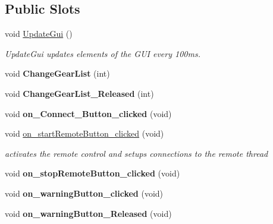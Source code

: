 \subsection*{Public Slots}
\begin{DoxyCompactItemize}
\item 
void \hyperlink{class_main_window_a042e863e901d40459d15a354ee4f9283}{Update\+Gui} ()
\begin{DoxyCompactList}\small\item\em Update\+Gui updates elements of the G\+U\+I every 100ms. \end{DoxyCompactList}\item 
\hypertarget{class_main_window_a3a9f39d07cb3fe42a152c05757c1da5a}{}void {\bfseries Change\+Gear\+List} (int)\label{class_main_window_a3a9f39d07cb3fe42a152c05757c1da5a}

\item 
\hypertarget{class_main_window_acd5aa2271fa4b95c8e315ea08e1ded23}{}void {\bfseries Change\+Gear\+List\+\_\+\+Released} (int)\label{class_main_window_acd5aa2271fa4b95c8e315ea08e1ded23}

\item 
\hypertarget{class_main_window_a5d07507433b877fab2041feb43a118aa}{}void {\bfseries on\+\_\+\+Connect\+\_\+\+Button\+\_\+clicked} (void)\label{class_main_window_a5d07507433b877fab2041feb43a118aa}

\item 
\hypertarget{class_main_window_a60ca4a58bd344915de9e4f3c4e56c15c}{}void \hyperlink{class_main_window_a60ca4a58bd344915de9e4f3c4e56c15c}{on\+\_\+start\+Remote\+Button\+\_\+clicked} (void)\label{class_main_window_a60ca4a58bd344915de9e4f3c4e56c15c}

\begin{DoxyCompactList}\small\item\em activates the remote control and setups connections to the remote thread \end{DoxyCompactList}\item 
\hypertarget{class_main_window_a7769c1b0723c2827f6cbcbc571c1d6d7}{}void {\bfseries on\+\_\+stop\+Remote\+Button\+\_\+clicked} (void)\label{class_main_window_a7769c1b0723c2827f6cbcbc571c1d6d7}

\item 
\hypertarget{class_main_window_adefd278b8a51511b1b7739f1fba58182}{}void {\bfseries on\+\_\+warning\+Button\+\_\+clicked} (void)\label{class_main_window_adefd278b8a51511b1b7739f1fba58182}

\item 
\hypertarget{class_main_window_aaba0478e64701fa9b96670c89f294e44}{}void {\bfseries on\+\_\+warning\+Button\+\_\+\+Released} (void)\label{class_main_window_aaba0478e64701fa9b96670c89f294e44}


\end{DoxyCompactItemize}

